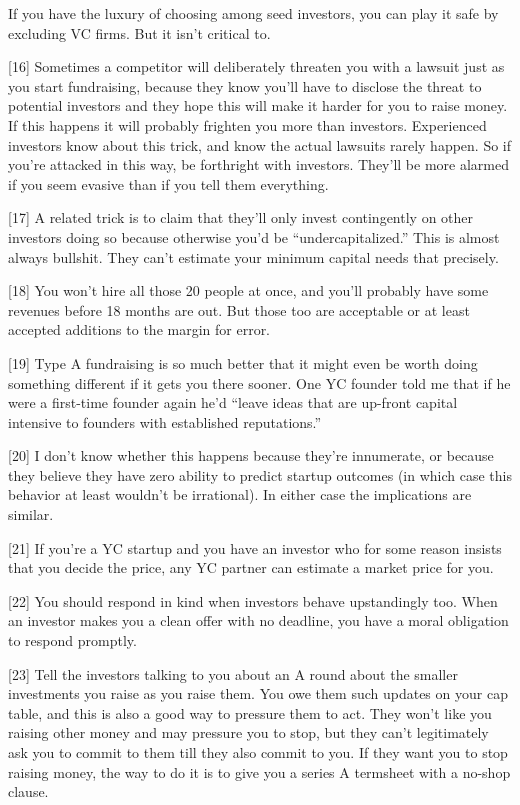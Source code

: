 If you have the luxury of choosing among seed investors, you can play it
safe by excluding VC firms. But it isn't critical to.

{[}16{]} Sometimes a competitor will deliberately threaten you with a
lawsuit just as you start fundraising, because they know you'll have to
disclose the threat to potential investors and they hope this will make
it harder for you to raise money. If this happens it will probably
frighten you more than investors. Experienced investors know about this
trick, and know the actual lawsuits rarely happen. So if you're attacked
in this way, be forthright with investors. They'll be more alarmed if
you seem evasive than if you tell them everything.

{[}17{]} A related trick is to claim that they'll only invest
contingently on other investors doing so because otherwise you'd be
``undercapitalized.'' This is almost always bullshit. They can't
estimate your minimum capital needs that precisely.

{[}18{]} You won't hire all those 20 people at once, and you'll probably
have some revenues before 18 months are out. But those too are
acceptable or at least accepted additions to the margin for error.

{[}19{]} Type A fundraising is so much better that it might even be
worth doing something different if it gets you there sooner. One YC
founder told me that if he were a first-time founder again he'd ``leave
ideas that are up-front capital intensive to founders with established
reputations.''

{[}20{]} I don't know whether this happens because they're innumerate,
or because they believe they have zero ability to predict startup
outcomes (in which case this behavior at least wouldn't be irrational).
In either case the implications are similar.

{[}21{]} If you're a YC startup and you have an investor who for some
reason insists that you decide the price, any YC partner can estimate a
market price for you.

{[}22{]} You should respond in kind when investors behave upstandingly
too. When an investor makes you a clean offer with no deadline, you have
a moral obligation to respond promptly.

{[}23{]} Tell the investors talking to you about an A round about the
smaller investments you raise as you raise them. You owe them such
updates on your cap table, and this is also a good way to pressure them
to act. They won't like you raising other money and may pressure you to
stop, but they can't legitimately ask you to commit to them till they
also commit to you. If they want you to stop raising money, the way to
do it is to give you a series A termsheet with a no-shop clause.

